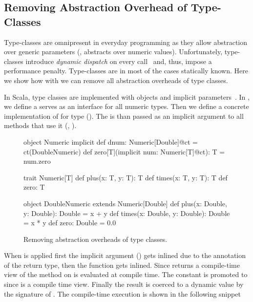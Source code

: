 \subsection{Removing Abstraction Overhead of Type-Classes}
\label{sct:type-classes-removal}

Type-classes are omnipresent in everyday programming as they allow abstraction over
 generic parameters (\eg,  abstracts over numeric values). Unfortunately,
 type-classes introduce \emph{dynamic dispatch} on every call~\cite{rompf_optimizing_2013} and,
 thus, impose a performance penalty. Type-classes are in most of the cases statically known. Here
 we show how with \ct we can remove all abstraction overheads of type classes.

In Scala, type classes are implemented with objects and implicit parameters~\cite{oliveira_type_2010}.
In , we define a  serves as an interface for
all numeric types. Then we define a concrete implementation of  for
type  (). The  is than passed
as an implicit argument  to all methods that use it (\eg, ).

\begin{figure}
\begin{listingtiny}
object Numeric {
  implicit def dnum: Numeric[Double]@ct =
    ct(DoubleNumeric)
  def zero[T](implicit num: Numeric[T]@ct): T =
    num.zero
}

trait Numeric[T] {
  def plus(x: T, y: T): T
  def times(x: T, y: T): T
  def zero: T
}

object DoubleNumeric extends Numeric[Double] {
  def plus(x: Double, y: Double): Double = x + y
  def times(x: Double, y: Double): Double = x * y
  def zero: Double = 0.0
}
\end{listingtiny}
\caption{\label{fig:numeric} Removing abstraction overheads of type classes.}
\end{figure}

When  is applied first the implicit argument () gets
inlined due to the  annotation of the return type, then the function  gets
inlined. Since  returns a compile-time view of 
the method  on  is evaluated at compile time. The constant  is
promoted to  since  is a compile time view. Finally the  result
is coerced to a dynamic value by the signature of . The
compile-time execution is shown in the following snippet

